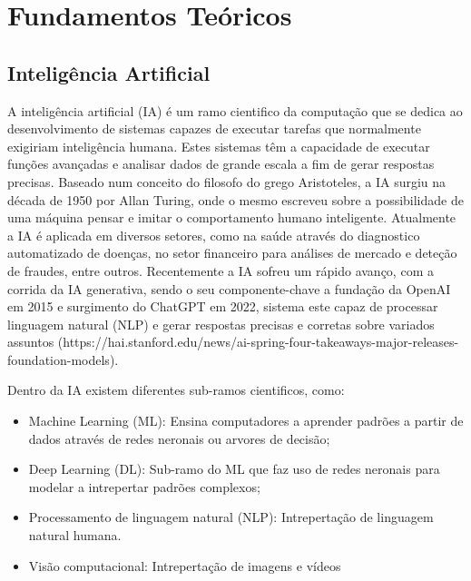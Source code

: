 
\chapter{Fundamentos Teóricos} %



\section{Inteligência Artificial}

A inteligência artificial (IA) é um ramo cientifico da computação que se dedica ao desenvolvimento de sistemas capazes de executar tarefas que normalmente exigiriam inteligência humana.
Estes sistemas têm a capacidade de executar funções avançadas e analisar dados de grande escala a fim de gerar respostas precisas.  Baseado num conceito do filosofo do grego Aristoteles, a IA surgiu na década de 1950 por Allan Turing, onde o mesmo escreveu sobre a possibilidade de uma máquina pensar e imitar o comportamento humano inteligente. 
Atualmente a IA é aplicada em diversos setores, como na saúde através do diagnostico automatizado de doenças, no setor financeiro para análises de mercado e deteção de fraudes, entre outros. Recentemente a IA sofreu um rápido avanço, com a corrida da IA generativa, sendo o seu componente-chave a fundação da OpenAI em 2015 e surgimento do ChatGPT em 2022, sistema este capaz de processar linguagem natural (NLP) e gerar respostas precisas e corretas sobre variados assuntos (https://hai.stanford.edu/news/ai-spring-four-takeaways-major-releases-foundation-models).

Dentro da IA existem diferentes sub-ramos cientificos, como:

\begin{itemize}
    \item Machine Learning (ML): Ensina computadores a aprender padrões a partir de dados através de redes neronais ou arvores de decisão;
    \item Deep Learning (DL): Sub-ramo do ML que faz uso de redes neronais para modelar a intrepertar padrões complexos;
    \item Processamento de linguagem natural (NLP): Intrepertação de linguagem natural humana.
    \item Visão computacional: Intrepertação de imagens e vídeos
\end{itemize}



